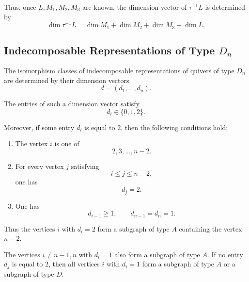 \documentclass[11pt, a4paper]{report}
\begin{document}
Thus, once \(L,M_1,M_2,M_3\) are known, the dimension vector of
\(\tau^{-1}L\) is determined by
\[
    \dim \tau^{-1}L
    =
    \dim M_1+\dim M_2+\dim M_3-\dim L.
\]

\subsection{Indecomposable Representations of Type \texorpdfstring{\(D_n\)}{Dn}}

The isomorphism classes of indecomposable representations of quivers of type
\(D_n\) are determined by their dimension vectors
\[
    d=(d_1,\dots,d_n).
\]

The entries of such a dimension vector satisfy
\[
    d_i\in \{0,1,2\}.
\]

Moreover, if some entry \(d_i\) is equal to \(2\), then the following conditions hold:

\begin{enumerate}
    \item The vertex \(i\) is one of
    \[
        2,3,\dots,n-2.
    \]

    \item For every vertex \(j\) satisfying
    \[
        i\leq j\leq n-2,
    \]
    one has
    \[
        d_j=2.
    \]

    \item One has
    \[
        d_{i-1}\geq 1,
        \qquad
        d_{n-1}=d_n=1.
    \]
\end{enumerate}

Thus the vertices \(i\) with \(d_i=2\) form a subgraph of type \(A\) containing
the vertex \(n-2\).

The vertices \(i\neq n-1,n\) with \(d_i=1\) also form a subgraph of type \(A\).
If no entry \(d_j\) is equal to \(2\), then all vertices \(i\) with \(d_i=1\) form
a subgraph of type \(A\) or a subgraph of type \(D\).
\end{document}

